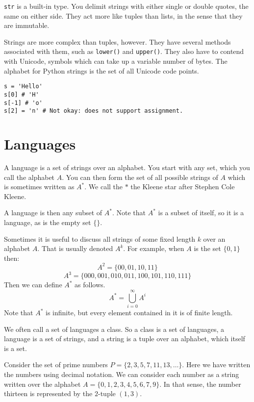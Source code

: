 \documentclass{iansnotes}
\begin{document}
   \texttt{str} is a built-in type.
  You delimit strings with either single or double quotes, the same on either side.
  They act more like tuples than lists, in the sense that they are immutable.
  
  Strings are more complex than tuples, however.
  They have several methods associated with them, such as \texttt{lower()} and \texttt{upper()}.
  They also have to contend with Unicode, symbols which can take up a variable number of bytes.
  The alphabet for Python strings is the set of all Unicode code points.

\begin{verbatim}
s = 'Hello'
s[0] # 'H'
s[-1] # 'o'
s[2] = 'n' # Not okay: does not support assignment.
\end{verbatim}

\section{Languages}
  A language is a set of strings over an alphabet.
  You start with any set, which you call the alphabet $A$.
  You can then form the set of all possible strings of $A$ which is sometimes written as $A^*$.
  We call the $*$ the Kleene star after Stephen Cole Kleene.

  A language is then any subset of $A^*$.
  Note that $A^*$ is a subset of itself, so it is a language, as is the empty set $\{\}$.
  
  Sometimes it is useful to discuss all strings of some fixed length $k$ over an alphabet $A$.
  That is usually denoted $A^k$.
  For example, when $A$ is the set $\{0, 1\}$ then:
  \[A^2 = \{ 00, 01, 10, 11 \} \]
  \[A^3 = \{ 000, 001, 010, 011, 100, 101, 110, 111 \} \]
  Then we can define $A^*$ as follows.
  \[A^* = \bigcup_{i=0}^\infty A^i\]
  Note that $A^*$ is infinite, but every element contained in it is of finite length.

  We often call a set of languages a class.
  So a class is a set of languages, a language is a set of strings, and a string is a tuple over an alphabet, which itself is a set.

  Consider the set of prime numbers $P = \{2, 3, 5, 7, 11, 13, \ldots\}$.
  Here we have written the numbers using decimal notation.
  We can consider each number as a string written over the alphabet $A = \{0,1,2,3,4,5,6,7,9\}$.
  In that sense, the number thirteen is represented by the $2$-tuple $(1, 3)$.
\end{document}
